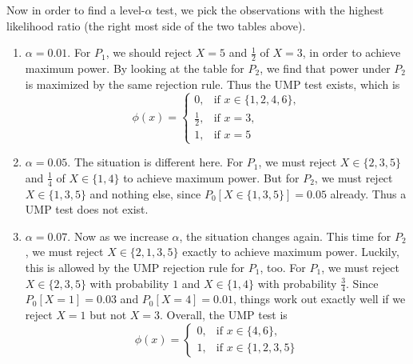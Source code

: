 \documentclass[12pt]{article}
\begin{document}
Now in order to find a level-$\alpha$ test,
we pick the observations with the highest likelihood ratio
(the right most side of the two tables above).
\begin{enumerate}
\item $\alpha = 0.01$.
  For $P_1$,
  we should reject $X = 5$ and $\frac{1}{2}$ of $X = 3$,
  in order to achieve maximum power.
  By looking at the table for $P_2$,
  we find that power under $P_2$ is maximized by the same rejection rule.
  Thus the UMP test exists, which is
  \[
    \phi(x) = \left.
    \begin{cases}
      0, & \text{if  } x \in \{1, 2, 4, 6\}, \\
      \frac{1}{2}, & \text{if  } x = 3, \\
      1, & \text{if  } x = 5
    \end{cases}
    \right.
  \]
\item $\alpha = 0.05$.
  The situation is different here.
  For $P_1$,
  we must reject $X \in \{2,3,5\}$ and $\frac{1}{4}$ of $X \in \{1,4\}$
  to achieve maximum power.
  But for $P_2$,
  we must reject $X \in \{1,3, 5\}$ and nothing else,
  since $P_0[X \in \{1,3,5\}] = 0.05$ already.
  Thus a UMP test does not exist.
\item $\alpha = 0.07$.
  Now as we increase $\alpha$, the situation changes again.
  This time for $P_2$,
  we must reject $X \in \{2,1,3,5\}$ exactly to achieve maximum power.
  Luckily, this is allowed by the UMP rejection rule for $P_1$, too.
  For $P_1$,
  we must reject $X \in \{2, 3, 5\}$ with probability $1$ and $X \in \{1,4\}$ with probability $\frac{3}{4}$.
  Since $P_0[X=1] = 0.03$ and $P_0[X=4] = 0.01$,
  things work out exactly well if we reject $X=1$ but not $X=3$.
  Overall, the UMP test is
  \[
    \phi(x) = \left.
    \begin{cases}
      0, & \text{if  } x \in \{4, 6\}, \\
      1, & \text{if  } x \in \{1,2,3,5\}
    \end{cases}
    \right.
  \]
\end{enumerate}

      
\end{document}
